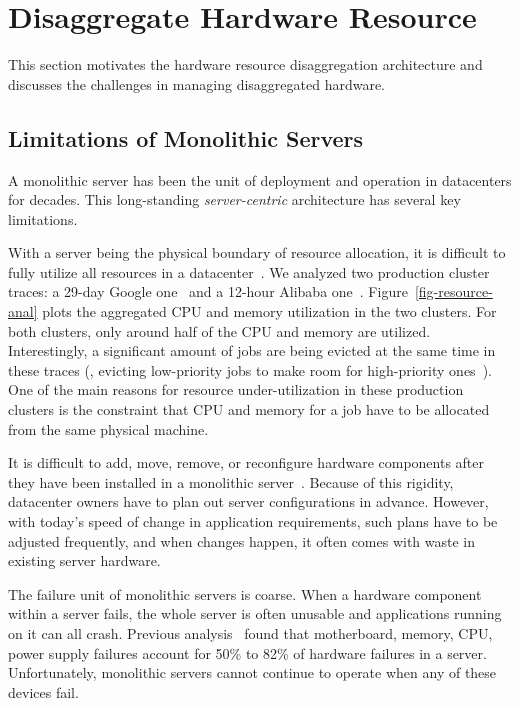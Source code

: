 \section{Disaggregate Hardware Resource}
\label{sec:lego:motivation}

This section
motivates the hardware resource disaggregation architecture
and discusses the challenges in managing disaggregated hardware.

\subsection{Limitations of Monolithic Servers}
\label{sec:lego:monolimit}
A monolithic server has been the unit of deployment and operation in datacenters for decades.
This long-standing {\em server-centric} architecture has several key limitations.

With a server being the physical boundary of resource allocation, 
it is difficult to fully utilize all resources in a datacenter~\cite{Barroso-COMPUTER,Quasar-ASPLOS,PowerNap}.
We analyzed two production cluster traces: a 29-day Google one~\cite{GoogleTrace}
and a 12-hour Alibaba one~\cite{AliTrace}.
Figure~\ref{fig-resource-anal} plots the aggregated CPU and memory utilization in the two clusters.
For both clusters, only around half of the CPU and memory are utilized.
Interestingly,
a significant amount of jobs are being evicted at the same time in these traces
(\eg, evicting low-priority jobs to make room for high-priority ones~\cite{Borg}).
One of the main reasons for resource under-utilization in these production clusters is 
the constraint that CPU and memory for a job have to be allocated from 
the same physical machine.



It is difficult to add, move, remove, or reconfigure hardware components
after they have been installed in a monolithic server~\cite{FB-Wedge100}. %
Because of this rigidity, datacenter owners have to plan out server configurations in advance.
However, with today's speed of change in application requirements, such plans have to be adjusted frequently,
and when changes happen, it often comes with waste in existing server hardware.

The failure unit of monolithic servers is coarse.
When a hardware component within a server fails, %
the whole server is often unusable and applications running on it can all crash.
Previous analysis~\cite{Failure-Disk-FAST07} found that motherboard, memory, CPU, power supply failures account for 
50\% to 82\% of hardware failures in a server.
Unfortunately, monolithic servers cannot continue to operate when any of these devices fail.

